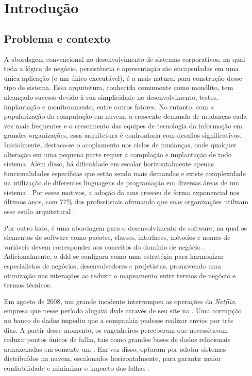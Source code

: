 \chapter{Introdução}
\label{cap:introducao}

\section{Problema e contexto}

A abordagem convencional no desenvolvimento de sistemas corporativos, na qual toda a lógica de negócio, persistência e apresentação são encapsuladas em uma única aplicação (e um único executável), é a mais natural para construção desse tipo de sistema. Essa arquitetura, conhecida comumente como monólito, tem alcançado sucesso devido à sua simplicidade no desenvolvimento, testes, implantação e monitoramento, entre outros fatores. No entanto, com a popularização da computação em nuvem, a crescente demanda de mudanças cada vez mais frequentes e o crescimento das equipes de tecnologia da informação em grandes organizações, essa arquitetura é confrontada com desafios significativos. Inicialmente, destaca-se o acoplamento nos ciclos de mudanças, onde qualquer alteração em uma pequena parte requer a compilação e implantação de todo sistema. Além disso, há dificuldade em escalar horizontalmente apenas funcionalidades específicas que estão sendo mais demandas e existe complexidade na utilização de diferentes linguagens de programação em diversas áreas de um sistema \cite{microservices}. Por esses motivos, a adoção da \acrlong{ams} cresceu de forma exponencial nos últimos anos, com 77\% dos profissionais afirmando que suas organizações utilizam esse estilo arquitetural \cite{microserviceAdoption}.

Por outro lado,  é uma abordagem para o desenvolvimento de software, na qual os elementos de software como pacotes, classes, interfaces, métodos e nomes de variáveis devem corresponder aos conceitos do domínio de negócio \cite{dddFowler}. Adicionalmente, o \acrshort{ddd} se configura como uma estratégia para harmonizar especialistas de negócios, desenvolvedores e projetistas, promovendo uma otimização nas interações ao reduzir o mapeamento entre termos de negócio e termos técnicos.

Em agosto de 2008, um grande incidente interrompeu as operações da \emph{Netflix}, empresa que nesse período alugava \acrshort{dvd}s através de seu site na . Uma corrupção no banco de dados impediu que a companhia pudesse realizar envios por três dias. A partir desse momento, os engenheiros perceberam que necessitavam reduzir pontos únicos de falha, tais como grandes bases de dados relacionais armazenadas em somente um . Em vez disso, optaram por adotar sistemas distribuídos na nuvem, escalonados horizontalmente, para garantir maior confiabilidade e minimizar o impacto das falhas \cite{netflixMigration}.

